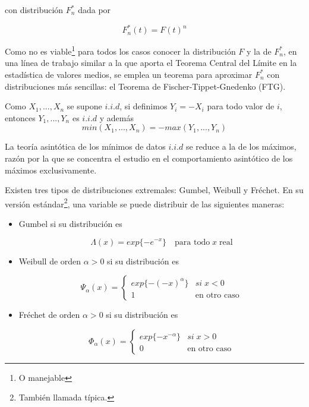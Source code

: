 \documentclass[
  12pt]{article}
\begin{document}
con distribución \(F_n^*\) dada por

\begin{equation}
F_n^* (t)= F(t)^n
\end{equation}

Como no es viable\footnote{O manejable} para todos los casos conocer la
distribución \(F\) y la de \(F_n^*\), en una línea de trabajo similar a
la que aporta el Teorema Central del Límite en la estadística de valores
medios, se emplea un teorema para aproximar \(F_n^{*}\) con
distribuciones más sencillas: el Teorema de Fischer-Tippet-Gnedenko
(FTG).

\begin{mydefinition}
Como $X_1,...,X_n$ se supone $i.i.d$, si definimos 
$Y_i = -X_i$ para todo valor de $i$, entonces $Y_1,...,Y_n$ es $i.i.d$ y
además
\begin{equation}
min(X_1,...,X_n) = - max(Y_1,...,Y_n)
\end{equation}
\end{mydefinition}

La teoría asintótica de los mínimos de datos \(i.i.d\) se reduce a la de
los máximos, razón por la que se concentra el estudio en el
comportamiento asintótico de los máximos exclusivamente.

\begin{mydefinition}
 Existen tres tipos de distribuciones extremales: Gumbel, Weibull y Fréchet. En su versión estándar\footnote{También llamada típica.}, una variable se puede distribuir de las siguientes maneras:

\begin{itemize}
\item Gumbel si su distribución es 

\begin{equation}
\Lambda(x) = exp\{-e^{-x}\} \quad\text{para todo}\; x \;\text{real} 
\end{equation}

\item Weibull de orden $\alpha>0$ si su distribución es

\begin{equation}
\Psi_{\alpha}(x)=\begin{cases}
exp\{-(-x)^{\alpha}\} & si\;x<0\\
1 & \text{en otro caso}
\end{cases}
\end{equation}

\item Fréchet de orden $\alpha>0$ si su distribución es

\begin{equation}
\Phi_{\alpha}(x)=\begin{cases}
exp\{-x^{-\alpha}\} & si\;x>0\\
0 & \text{en otro caso}
\end{cases}
\end{equation}
\end{itemize}
\end{mydefinition}
\end{document}
